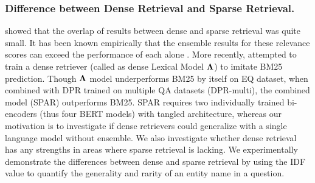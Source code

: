 \documentclass[letterpaper]{article} %
\begin{document}
\subsubsection{Difference between Dense Retrieval and Sparse Retrieval.}
\citet{replication_dpr} showed that the overlap of results between dense and sparse retrieval was quite small.
It has been known empirically that the ensemble results for these relevance scores can exceed the performance of each alone \citep[e.g.,][]{karpukhin-etal-2020-dense}.
More recently, \citet{Chen2021SalientPA} attempted to train a dense retriever (called as dense Lexical Model $\bf{\Lambda}$) to imitate BM25 prediction.
Though $\bf{\Lambda}$ model underperforms BM25 by itself on EQ dataset, when combined with DPR trained on multiple QA datasets (DPR-multi), the combined model (SPAR) outperforms BM25.
SPAR requires two individually trained bi-encoders (thus four BERT models) with tangled architecture, whereas our motivation is to investigate if dense retrievers could generalize with a single language model without ensemble.
We also investigate whether dense retrieval has any strengths in areas where sparse retrieval is lacking.
We experimentally demonstrate the differences between dense and sparse retrieval by using the IDF value to quantify the generality and rarity of an entity name in a question.
\end{document}
